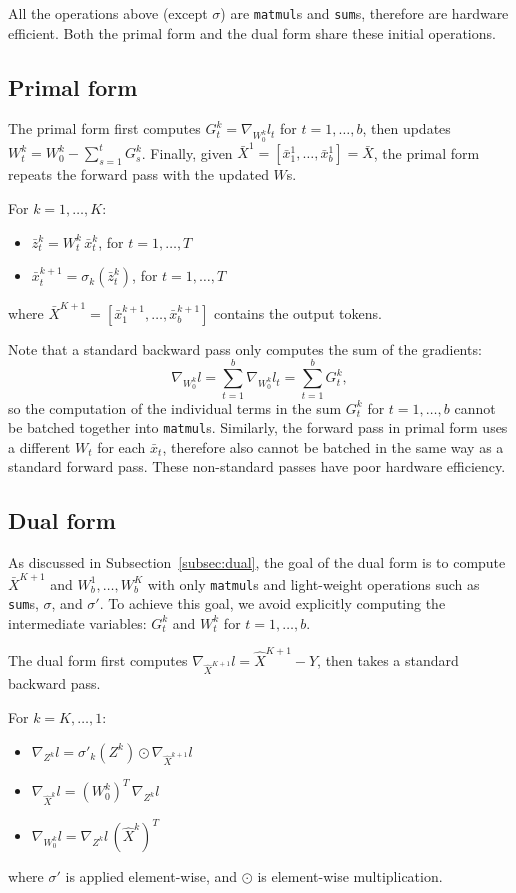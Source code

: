\documentclass{article}
\begin{document}
All the operations above (except $\sigma$) are \texttt{matmul}s and \texttt{sum}s, therefore are hardware efficient.
Both the primal form and the dual form share these initial operations. 

\subsection{Primal form}
The primal form first computes $G^k_t = \nabla_{W^k_0}l_t$ for $t=1,\dots,b$, then updates $W^k_t = W_0^k - \sum_{s=1}^t G^k_s$. 
Finally, given $\bar{X}^1 = [\bar{x}_1^1,\dots,\bar{x}_b^1] = \bar{X}$, the primal form repeats the forward pass with the updated $W$s.

For $k = 1,\dots,K$:
\begin{itemize}
    \item $\bar{z}_t^k = W_t^k \, \bar{x}_t^k$, for $t=1,\dots,T$
    \item $\bar{x}_t^{k+1} = \sigma_k(\bar{z}_t^k)$, for $t=1,\dots,T$
\end{itemize}
where $\bar{X}^{K+1} = [\bar{x}_1^{k+1},\dots,\bar{x}_b^{k+1}]$ contains the output tokens.

Note that a standard backward pass only computes the sum of the gradients:
$$
\nabla_{W_0^k}l  = \sum_{t=1}^b \nabla_{W^k_0}l_t = \sum_{t=1}^b G^k_t,
$$
so the computation of the individual terms in the sum $G^k_t$ for $t=1,\dots,b$ cannot be batched together into \texttt{matmul}s.
Similarly, the forward pass in primal form uses a different $W_t$ for each $\bar{x}_t$, therefore also cannot be batched in the same way as a standard forward pass.
These non-standard passes have poor hardware efficiency.

\subsection{Dual form}
As discussed in Subsection~\ref{subsec:dual}, the goal of the dual form is to compute $\bar{X}^{K+1}$ and $W_b^1,\dots,W_b^K$ with only \texttt{matmul}s and light-weight operations such as \texttt{sum}s, $\sigma$, and $\sigma'$.
To achieve this goal, we avoid explicitly computing the intermediate variables: $G^k_t$ and $W^k_t$ for $t=1,\dots,b$.

The dual form first computes 
$\nabla_{\hat{X}^{K+1}}l = \hat{X}^{K+1} - Y$, then takes a standard backward pass.

For $k = K,\dots,1$:
\begin{itemize}
    \item $\nabla_{Z^k}l = \sigma'_k\left( Z^k \right)\odot\nabla_{\hat{X}^{k+1}}l$
    \item $\nabla_{\hat{X}^k}l = \left(W_0^k\right)^T \, \nabla_{Z^k}l$
    \item $\nabla_{W_0^k}l = \nabla_{Z^k}l \, \left(\hat{X}^k\right)^T$
\end{itemize}
where $\sigma'$ is applied element-wise, and $\odot$ is element-wise multiplication.
\end{document}
